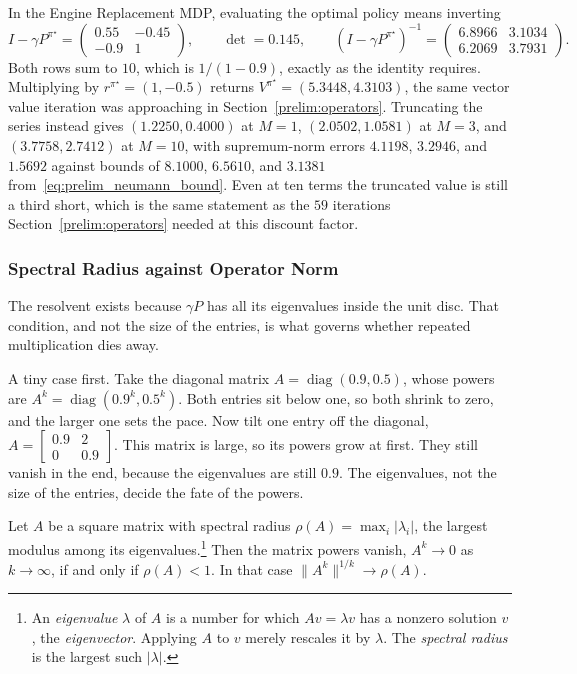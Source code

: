 In the Engine Replacement MDP, evaluating the optimal policy means inverting
\begin{equation*}
I - \gamma P^{\pi^\star} = \begin{pmatrix} 0.55 & -0.45 \\ -0.9 & 1 \end{pmatrix},
\qquad
\det = 0.145,
\qquad
(I - \gamma P^{\pi^\star})^{-1} = \begin{pmatrix} 6.8966 & 3.1034 \\ 6.2069 & 3.7931 \end{pmatrix}.
\end{equation*}
Both rows sum to $10$, which is $1/(1-0.9)$, exactly as the identity requires. Multiplying by $r^{\pi^\star} = (1, -0.5)$ returns $V^{\pi^\star} = (5.3448, 4.3103)$, the same vector value iteration was approaching in Section~\ref{prelim:operators}. Truncating the series instead gives $(1.2250, 0.4000)$ at $M = 1$, $(2.0502, 1.0581)$ at $M = 3$, and $(3.7758, 2.7412)$ at $M = 10$, with supremum-norm errors $4.1198$, $3.2946$, and $1.5692$ against bounds of $8.1000$, $6.5610$, and $3.1381$ from~\eqref{eq:prelim_neumann_bound}. Even at ten terms the truncated value is still a third short, which is the same statement as the $59$ iterations Section~\ref{prelim:operators} needed at this discount factor.

\subsubsection{Spectral Radius against Operator Norm}

The resolvent exists because $\gamma P$ has all its eigenvalues inside the unit disc. That condition, and not the size of the entries, is what governs whether repeated multiplication dies away.

A tiny case first. Take the diagonal matrix $A = \operatorname{diag}(0.9, 0.5)$, whose powers are $A^k = \operatorname{diag}(0.9^k, 0.5^k)$. Both entries sit below one, so both shrink to zero, and the larger one sets the pace. Now tilt one entry off the diagonal, $A = \left[\begin{smallmatrix} 0.9 & 2 \\ 0 & 0.9 \end{smallmatrix}\right]$. This matrix is large, so its powers grow at first. They still vanish in the end, because the eigenvalues are still $0.9$. The eigenvalues, not the size of the entries, decide the fate of the powers.

\begin{theorem}
\label{thm:prelim_spectral}
Let $A$ be a square matrix with spectral radius $\rho(A) = \max_i |\lambda_i|$, the largest modulus among its eigenvalues.\footnote{An \emph{eigenvalue} $\lambda$ of $A$ is a number for which $Av = \lambda v$ has a nonzero solution $v$, the \emph{eigenvector}. Applying $A$ to $v$ merely rescales it by $\lambda$. The \emph{spectral radius} is the largest such $|\lambda|$.} Then the matrix powers vanish, $A^k \to 0$ as $k \to \infty$, if and only if $\rho(A) < 1$. In that case $\|A^k\|^{1/k} \to \rho(A)$.
\end{theorem}

